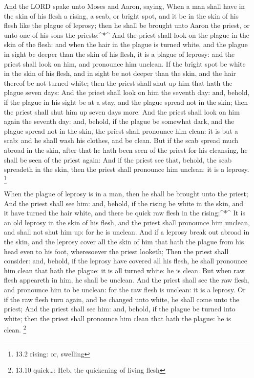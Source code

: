  And the LORD spake unto Moses and Aaron, saying,
 When a man shall have in the skin of his flesh a rising, a
scab, or bright spot, and it be in the skin of his flesh like the plague
of leprosy; then he shall be brought unto Aaron the priest, or unto one
of his sons the priests:\^{}*\^{}  And the priest shall look
on the plague in the skin of the flesh: and when the hair in the plague
is turned white, and the plague in sight be deeper than the skin of his
flesh, it is a plague of leprosy: and the priest shall look on him, and
pronounce him unclean.  If the bright spot be white in the
skin of his flesh, and in sight be not deeper than the skin, and the
hair thereof be not turned white; then the priest shall shut up him that
hath the plague seven days:  And the priest shall look on
him the seventh day: and, behold, if the plague in his sight be at a
stay, and the plague spread not in the skin; then the priest shall shut
him up seven days more:  And the priest shall look on him
again the seventh day: and, behold, if the plague be somewhat dark, and
the plague spread not in the skin, the priest shall pronounce him clean:
it is but a scab: and he shall wash his clothes, and be clean.
 But if the scab spread much abroad in the skin, after that
he hath been seen of the priest for his cleansing, he shall be seen of
the priest again:  And if the priest see that, behold, the
scab spreadeth in the skin, then the priest shall pronounce him unclean:
it is a leprosy. \footnote{13.2 rising: or, swelling}

 When the plague of leprosy is in a man, then he shall be
brought unto the priest;  And the priest shall see him:
and, behold, if the rising be white in the skin, and it have turned the
hair white, and there be quick raw flesh in the rising;\^{}*\^{}
 It is an old leprosy in the skin of his flesh, and the
priest shall pronounce him unclean, and shall not shut him up: for he is
unclean.  And if a leprosy break out abroad in the skin,
and the leprosy cover all the skin of him that hath the plague from his
head even to his foot, wheresoever the priest looketh; 
Then the priest shall consider: and, behold, if the leprosy have covered
all his flesh, he shall pronounce him clean that hath the plague: it is
all turned white: he is clean.  But when raw flesh
appeareth in him, he shall be unclean.  And the priest
shall see the raw flesh, and pronounce him to be unclean: for the raw
flesh is unclean: it is a leprosy.  Or if the raw flesh
turn again, and be changed unto white, he shall come unto the priest;
 And the priest shall see him: and, behold, if the plague
be turned into white; then the priest shall pronounce him clean that
hath the plague: he is clean. \footnote{13.10 quick\ldots: Heb. the
  quickening of living flesh}

